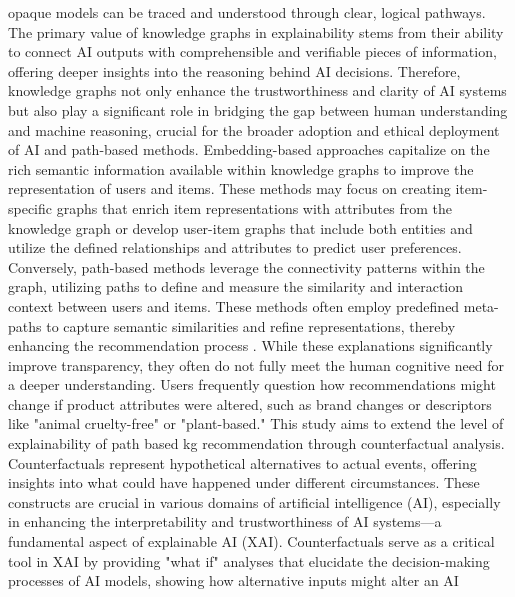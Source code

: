 opaque models can be traced and understood through clear, logical pathways. The primary
value of knowledge graphs in explainability stems from their ability to connect AI
outputs with comprehensible and verifiable pieces of information, offering
deeper insights into the reasoning behind AI decisions. Therefore, knowledge
graphs not only enhance the trustworthiness and clarity of AI systems but also
play a significant role in bridging the gap between human understanding and
machine reasoning, crucial for the broader adoption and ethical deployment of AI
and path-based methods. Embedding-based approaches capitalize on the rich
semantic information available within knowledge graphs to improve the
representation of users and items. These methods may focus on creating item-specific
graphs that enrich item representations with attributes from the knowledge graph
or develop user-item graphs that include both entities and utilize the defined relationships
and attributes to predict user preferences. Conversely, path-based methods leverage
the connectivity patterns within the graph, utilizing paths to define and
measure the similarity and interaction context between users and items. These methods
often employ predefined meta-paths to capture semantic similarities and refine representations,
thereby enhancing the recommendation process \parencite{guo_survey_2020}. While these
explanations significantly improve transparency, they often do not fully meet the
human cognitive need for a deeper understanding. Users frequently question how
recommendations might change if product attributes were altered, such as brand changes
or descriptors like "animal cruelty-free" or "plant-based." This study aims to
extend the level of explainability of path based kg recommendation through
counterfactual analysis. Counterfactuals represent hypothetical alternatives to actual
events, offering insights into what could have happened under different
circumstances. These constructs are crucial in various domains of artificial intelligence
(AI), especially in enhancing the interpretability and trustworthiness of AI
systems—a fundamental aspect of explainable AI (XAI). Counterfactuals serve as a
critical tool in XAI by providing "what if" analyses that elucidate the decision-making
processes of AI models, showing how alternative inputs might alter an AI
